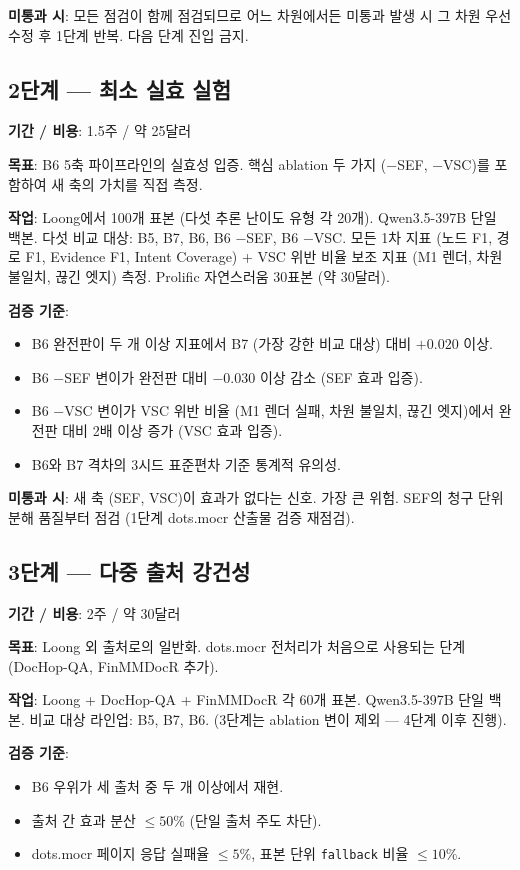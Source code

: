 \documentclass[11pt]{article}
\begin{document}
\textbf{미통과 시}: 모든 점검이 함께 점검되므로 어느 차원에서든 미통과 발생 시 그 차원 우선 수정 후 1단계 반복. 다음 단계 진입 금지.

\subsection{2단계 — 최소 실효 실험}

\textbf{기간 / 비용}: 1.5주 / 약 25달러

\textbf{목표}: B6 5축 파이프라인의 실효성 입증. 핵심 ablation 두 가지 (−SEF, −VSC)를 포함하여 새 축의 가치를 직접 측정.

\textbf{작업}: Loong에서 100개 표본 (다섯 추론 난이도 유형 각 20개). Qwen3.5-397B 단일 백본. 다섯 비교 대상: B5, B7, B6, B6 −SEF, B6 −VSC. 모든 1차 지표 (노드 F1, 경로 F1, Evidence F1, Intent Coverage) + VSC 위반 비율 보조 지표 (M1 렌더, 차원 불일치, 끊긴 엣지) 측정. Prolific 자연스러움 30표본 (약 30달러).

\textbf{검증 기준}:
\begin{itemize}[leftmargin=*]
    \item B6 완전판이 두 개 이상 지표에서 B7 (가장 강한 비교 대상) 대비 $+0.020$ 이상.
    \item B6 −SEF 변이가 완전판 대비 $-0.030$ 이상 감소 (SEF 효과 입증).
    \item B6 −VSC 변이가 VSC 위반 비율 (M1 렌더 실패, 차원 불일치, 끊긴 엣지)에서 완전판 대비 2배 이상 증가 (VSC 효과 입증).
    \item B6와 B7 격차의 3시드 표준편차 기준 통계적 유의성.
\end{itemize}

\textbf{미통과 시}: 새 축 (SEF, VSC)이 효과가 없다는 신호. 가장 큰 위험. SEF의 청구 단위 분해 품질부터 점검 (1단계 dots.mocr 산출물 검증 재점검).

\subsection{3단계 — 다중 출처 강건성}

\textbf{기간 / 비용}: 2주 / 약 30달러

\textbf{목표}: Loong 외 출처로의 일반화. dots.mocr 전처리가 처음으로 사용되는 단계 (DocHop-QA, FinMMDocR 추가).

\textbf{작업}: Loong + DocHop-QA + FinMMDocR 각 60개 표본. Qwen3.5-397B 단일 백본. 비교 대상 라인업: B5, B7, B6. (3단계는 ablation 변이 제외 — 4단계 이후 진행).

\textbf{검증 기준}:
\begin{itemize}[leftmargin=*]
    \item B6 우위가 세 출처 중 두 개 이상에서 재현.
    \item 출처 간 효과 분산 $\leq 50\%$ (단일 출처 주도 차단).
    \item dots.mocr 페이지 응답 실패율 $\leq 5\%$, 표본 단위 \texttt{fallback} 비율 $\leq 10\%$.
\end{itemize}
\end{document}
